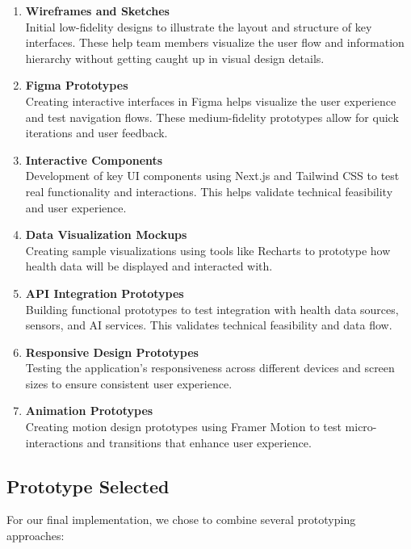 \begin{enumerate}
    \item \textbf{Wireframes and Sketches}\\
    Initial low-fidelity designs to illustrate the layout and structure of key interfaces. These help team members visualize the user flow and information hierarchy without getting caught up in visual design details.

    \item \textbf{Figma Prototypes}\\
    Creating interactive interfaces in Figma helps visualize the user experience and test navigation flows. These medium-fidelity prototypes allow for quick iterations and user feedback.

    \item \textbf{Interactive Components}\\
    Development of key UI components using Next.js and Tailwind CSS to test real functionality and interactions. This helps validate technical feasibility and user experience.

    \item \textbf{Data Visualization Mockups}\\
    Creating sample visualizations using tools like Recharts to prototype how health data will be displayed and interacted with.

    \item \textbf{API Integration Prototypes}\\
    Building functional prototypes to test integration with health data sources, sensors, and AI services. This validates technical feasibility and data flow.

    \item \textbf{Responsive Design Prototypes}\\
    Testing the application's responsiveness across different devices and screen sizes to ensure consistent user experience.

    \item \textbf{Animation Prototypes}\\
    Creating motion design prototypes using Framer Motion to test micro-interactions and transitions that enhance user experience.
\end{enumerate}

\subsection{Prototype Selected}
For our final implementation, we chose to combine several prototyping approaches:

